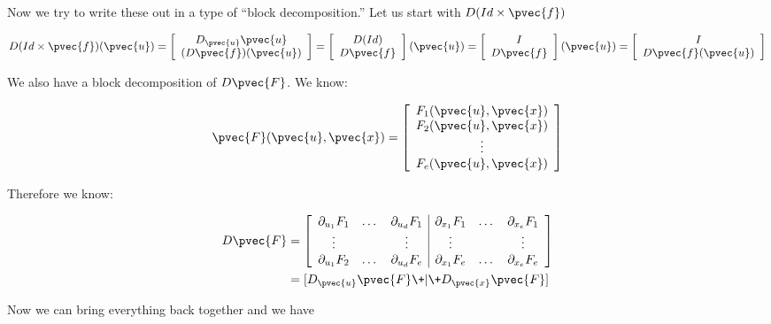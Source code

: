 \documentclass[11 pt, twoside]{article}
\begin{document}
Now we try to write these out in a type of ``block decomposition.'' Let us start
with $D(Id \times \pvec{f})$

\[
D(Id \times \pvec{f})(\pvec{u}) = \left[\begin{array}{c}
D_{\pvec{u}}\pvec{u} \\
(D\pvec{f})(\pvec{u}) \\
\end{array}\right]
= \left[\begin{array}{c}
D(Id) \\
D\pvec{f}\\
\end{array}\right](\pvec{u})
= \left[\begin{array}{c}
I \\
D\pvec{f}\\
\end{array}\right] (\pvec{u})
=  \left[\begin{array}{c}
I \\
D\pvec{f} (\pvec{u})\\
\end{array}\right]
\]

We also have a block decomposition of $D\pvec{F}$. We know:

\[
\pvec{F}(\pvec{u}, \pvec{x}) = \left[\begin{array}{c}
F_1(\pvec{u}, \pvec{x}) \\
F_2(\pvec{u}, \pvec{x}) \\
\vdots \\
F_e(\pvec{u}, \pvec{x}) \\
\end{array}\right]
\]

Therefore we know:

\begin{align*}
D\pvec{F} &= \left[\begin{array}{ccc|ccc}
\partial_{u_1} F_1 & \dots & \partial_{u_d} F_1 & \partial_{x_1}
F_1  & \dots & \partial_{x_e} F_1\\
\vdots & & \vdots & \vdots & & \vdots \\
\partial_{u_1} F_2 & \dots & \partial_{u_d} F_e & \partial_{x_1} F_e
& \dots & \partial_{x_e} F_e\\
\end{array}\right] \\
&= [D_{\pvec{u}} \pvec{F} \+|\+ D_{\pvec{x}} \pvec{F}]
\end{align*}

Now we can bring everything back together and we have
\end{document}
